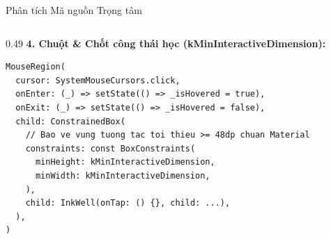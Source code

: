 \documentclass[aspectratio=169, 10pt]{beamer}
\begin{document}
\begin{frame}[fragile]{Phân tích Mã nguồn Trọng tâm}
\begin{columns}[T]
\begin{column}{0.49\textwidth}
      \vskip 0.04cm
      \textbf{\scriptsize 4. Chuột \& Chốt công thái học (kMinInteractiveDimension):}
\begin{lstlisting}
MouseRegion(
  cursor: SystemMouseCursors.click,
  onEnter: (_) => setState(() => _isHovered = true),
  onExit: (_) => setState(() => _isHovered = false),
  child: ConstrainedBox(
    // Bao ve vung tuong tac toi thieu >= 48dp chuan Material
    constraints: const BoxConstraints(
      minHeight: kMinInteractiveDimension,
      minWidth: kMinInteractiveDimension,
    ),
    child: InkWell(onTap: () {}, child: ...),
  ),
)
\end{lstlisting}
    \end{column}
  \end{columns}
\end{frame}

\end{document}
